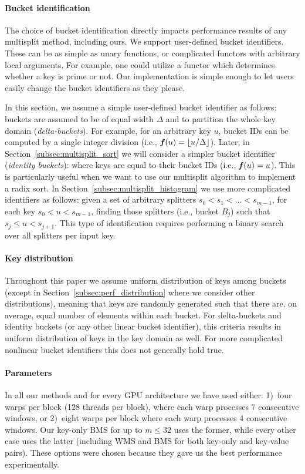 \paragraph{Bucket identification}
The choice of bucket identification directly impacts performance results of any multisplit method, including ours.
We support user-defined bucket identifiers.
These can be as simple as unary functions, or complicated functors with arbitrary local arguments. For example, one could utilize a functor which determines whether a key is prime or not.
Our implementation is simple enough to let users easily change the bucket identifiers as they please.

In this section, we assume a simple user-defined bucket identifier as follows: buckets are assumed to be of equal width $\Delta$ and to partition the whole key domain (\emph{delta-buckets}). For example, for an arbitrary key $u$, bucket IDs can be computed by a single integer division (i.e., $\defn{f}(u) = \lfloor u/ \Delta\rfloor$).
Later, in Section~\ref{subsec:multisplit_sort} we will consider a simpler bucket identifier (\emph{identity buckets}): where keys are equal to their bucket IDs (i.e., $\defn{f}(u) = u$).
This is particularly useful when we want to use our multisplit algorithm to implement a radix sort.
In Section~\ref{subsec:multisplit_histogram} we use more complicated identifiers as follows: given a set of arbitrary splitters $s_0< s_1 < \dots < s_{m-1}$, for each key $s_0 < u < s_{m-1}$, finding those splitters (i.e., bucket $B_j$) such that $s_j \leq u < s_{j+1}$. This type of identification requires performing a binary search over all splitters per input key.

\paragraph{Key distribution}
Throughout this paper we assume uniform distribution of keys among buckets (except in Section~\ref{subsec:perf_distribution} where we consider other distributions), meaning that keys are randomly generated such that there are, on average, equal number of elements within each bucket.
For delta-buckets and identity buckets (or any other linear bucket identifier), this criteria results in uniform distribution of keys in the key domain as well.
For more complicated nonlinear bucket identifiers this does not generally hold true.

\paragraph{Parameters} In all our methods and for every GPU architecture we have used either: 1)~four warps per block (128 threads per block), where each warp processes 7 consecutive windows, or 2)~eight warps per block where each warp processes 4 consecutive windows.
Our key-only BMS for up to $m \leq 32$ uses the former, while every other case uses the latter (including WMS and BMS for both key-only and key-value pairs).
These options were chosen because they gave us the best performance experimentally.

